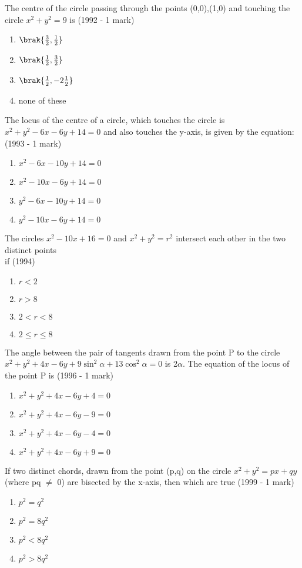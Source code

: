     \item The centre of the circle passing through the points (0,0),(1,0) and touching the circle $x^{2}+y^{2}=9$ is
    \hfill {(1992 - 1 mark)}
    \begin{enumerate}
    \item $\brak{\frac{3}{2},\frac{1}{2}}$
    \item $\brak{\frac{1}{2},\frac{3}{2}}$
    \item $\brak{\frac{1}{2},-2\frac{1}{2}}$
    \item none of these
    \end{enumerate}
    \item The locus of the centre of a circle, which touches the circle is $x^{2}+y^{2}-6x-6y+14=0$ and also touches the y-axis, is given by the equation: \hfill {(1993 - 1 mark)}
    \begin{enumerate}
    \item $x^{2}-6x-10y+14=0$
    \item $x^{2}-10x-6y+14=0$
    \item $y^{2}-6x-10y+14=0$
    \item $y^{2}-10x-6y+14=0$
    \end{enumerate}
    \item The circles $x^{2}-10x+16=0$ and $x^{2}+y^{2}=r^{2}$ intersect each other in the two distinct points\\ if
    \hfill {(1994)}
    \begin{enumerate}
    \item $r<2$
    \item $r>8$
    \item $2<r<8$
    \item $2\leq r\leq8$
    \end{enumerate}
    \item The angle between the pair of tangents drawn from the point P to the circle $x^{2}+y^{2}+4x-6y+9\sin^{2}{\alpha}+13\cos^{2}{\alpha}=0$ is 2$\alpha$. The equation of the locus of the point P is
    \hfill {(1996 - 1 mark)}
    \begin{enumerate}
    \item $x^{2}+y^{2}+4x-6y+4=0$
    \item $x^{2}+y^{2}+4x-6y-9=0$
    \item $x^{2}+y^{2}+4x-6y-4=0$
    \item $x^{2}+y^{2}+4x-6y+9=0$
    \end{enumerate}
    \item If two distinct chords, drawn from the point (p,q) on the circle $x^{2}+y^{2}=px+qy$ (where pq $\neq$ 0) are bisected by the x-axis, then which are true
    \hfill {(1999 - 1 mark)}
    \begin{enumerate}
    \item $p^{2}=q^{2}$
    \item $p^{2}=8q^{2}$ 
    \item $p^{2}<8q^{2}$
    \item $p^{2}>8q^{2}$
    \end{enumerate}
    
